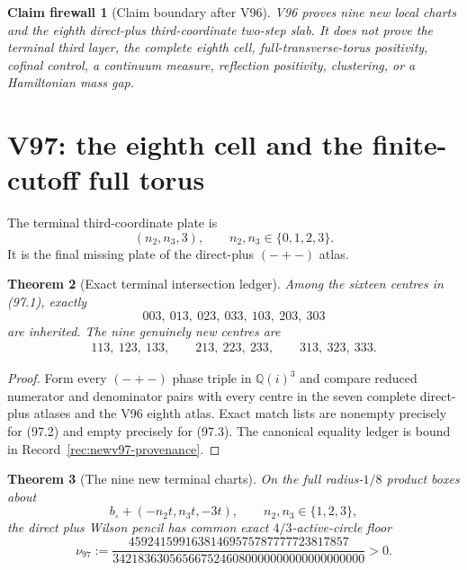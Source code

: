 \documentclass[11pt,oneside]{article}
\newtheorem{theorem}{Theorem}[section]
\newtheorem{firewall}[theorem]{Claim firewall}
\theoremstyle{definition}
\theoremstyle{remark}
\begin{document}
\begin{firewall}[Claim boundary after V96]
\label{fire:newv96-final}
V96 proves nine new local charts and the eighth direct-plus
third-coordinate two-step slab.  It does not prove the terminal
third layer, the complete eighth cell, full-transverse-torus
positivity, cofinal control, a continuum measure, reflection
positivity, clustering, or a Hamiltonian mass gap.
\end{firewall}

\section{V97: the eighth cell and the finite-cutoff full torus}
\label{sec:newv97-eighth-cell}

The terminal third-coordinate plate is
\[
 (n_2,n_3,3),\qquad n_2,n_3\in\{0,1,2,3\}.          \tag{97.1}
\]
It is the final missing plate of the direct-plus \((-+-)\) atlas.

\begin{theorem}[Exact terminal intersection ledger]
\label{thm:newv97-intersection}
Among the sixteen centres in (97.1), exactly
\[
 003,\ 013,\ 023,\ 033,\ 103,\ 203,\ 303             \tag{97.2}
\]
are inherited.  The nine genuinely new centres are
\[
\begin{gathered}
 113,\ 123,\ 133,\qquad
 213,\ 223,\ 233,\qquad
 313,\ 323,\ 333.                                    \tag{97.3}
\end{gathered}
\]
\end{theorem}

\begin{proof}
Form every \((-+-)\) phase triple in \(\mathbb Q(i)^3\) and compare
reduced numerator and denominator pairs with every centre in the
seven complete direct-plus atlases and the V96 eighth atlas.  Exact
match lists are nonempty precisely for (97.2) and empty precisely
for (97.3).  The canonical equality ledger is bound in
Record~\ref{rec:newv97-provenance}.
\end{proof}

\begin{theorem}[The nine new terminal charts]
\label{thm:newv97-nine-charts}
On the full radius-\(1/8\) product boxes about
\[
 b_\circ+(-n_2t,n_3t,-3t),\qquad
 n_2,n_3\in\{1,2,3\},                               \tag{97.4}
\]
the direct plus Wilson pencil has common exact
\(4/3\)-active-circle floor
\[
\nu_{97}:=
\frac{45924159916381469575787777723817857}
     {3421836305656675246080000000000000000000}>0.   \tag{97.5}
\]
\end{theorem}
\end{document}
